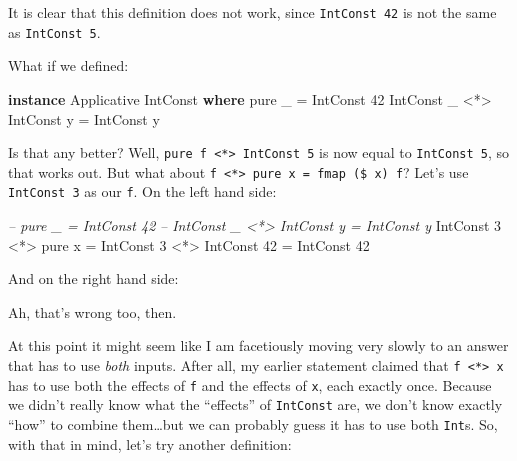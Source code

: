 \documentclass[]{article}
\newenvironment{Shaded}{}{}
\newcommand{\CommentTok}[1]{\textcolor[rgb]{0.38,0.63,0.69}{\textit{#1}}}
\newcommand{\DataTypeTok}[1]{\textcolor[rgb]{0.56,0.13,0.00}{#1}}
\newcommand{\DecValTok}[1]{\textcolor[rgb]{0.25,0.63,0.44}{#1}}
\newcommand{\FunctionTok}[1]{\textcolor[rgb]{0.02,0.16,0.49}{#1}}
\newcommand{\KeywordTok}[1]{\textcolor[rgb]{0.00,0.44,0.13}{\textbf{#1}}}
\newcommand{\NormalTok}[1]{#1}
\begin{document}
It is clear that this definition does not work, since \texttt{IntConst\ 42} is
not the same as \texttt{IntConst\ 5}.

What if we defined:

\begin{Shaded}
\begin{Highlighting}[]
\KeywordTok{instance} \DataTypeTok{Applicative} \DataTypeTok{IntConst} \KeywordTok{where}
\NormalTok{    pure _                    }\FunctionTok{=} \DataTypeTok{IntConst} \DecValTok{42}
    \DataTypeTok{IntConst}\NormalTok{ _ }\FunctionTok{<*>} \DataTypeTok{IntConst}\NormalTok{ y }\FunctionTok{=} \DataTypeTok{IntConst}\NormalTok{ y}
\end{Highlighting}
\end{Shaded}

Is that any better? Well,
\texttt{pure\ f\ \textless{}*\textgreater{}\ IntConst\ 5} is now equal to
\texttt{IntConst\ 5}, so that works out. But what about
\texttt{f\ \textless{}*\textgreater{}\ pure\ x\ =\ fmap\ (\$\ x)\ f}? Let's use
\texttt{IntConst\ 3} as our \texttt{f}. On the left hand side:

\begin{Shaded}
\begin{Highlighting}[]
\CommentTok{-- pure _                    = IntConst 42}
\CommentTok{-- IntConst _ <*> IntConst y = IntConst y}
\DataTypeTok{IntConst} \DecValTok{3} \FunctionTok{<*>}\NormalTok{ pure x }\FunctionTok{=} \DataTypeTok{IntConst} \DecValTok{3} \FunctionTok{<*>} \DataTypeTok{IntConst} \DecValTok{42}
                      \FunctionTok{=} \DataTypeTok{IntConst} \DecValTok{42}
\end{Highlighting}
\end{Shaded}

And on the right hand side:

\begin{Shaded}
\end{Shaded}

Ah, that's wrong too, then.

At this point it might seem like I am facetiously moving very slowly to an
answer that has to use \emph{both} inputs. After all, my earlier statement
claimed that \texttt{f\ \textless{}*\textgreater{}\ x} has to use both the
effects of \texttt{f} and the effects of \texttt{x}, each exactly once. Because
we didn't really know what the ``effects'' of \texttt{IntConst} are, we don't
know exactly ``how'' to combine them\ldots{}but we can probably guess it has to
use both \texttt{Int}s. So, with that in mind, let's try another definition:
\end{document}

